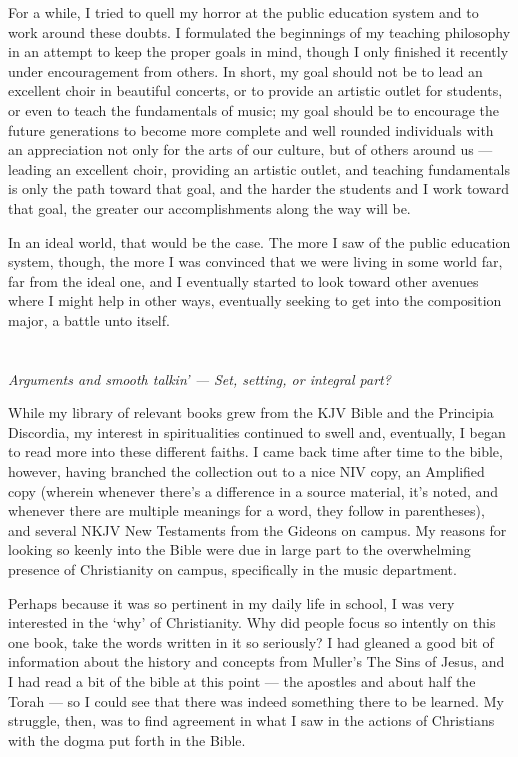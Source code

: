 \documentclass{book}
\begin{document}
For a while, I tried to quell my horror at the public education system and to work around these doubts.  I formulated the beginnings of my teaching philosophy in an attempt to keep the proper goals in mind, though I only finished it recently under encouragement from others.  In short, my goal should not be to lead an excellent choir in beautiful concerts, or to provide an artistic outlet for students, or even to teach the fundamentals of music; my goal should be to encourage the future generations to become more complete and well rounded individuals with an appreciation not only for the arts of our culture, but of others around us --- leading an excellent choir, providing an artistic outlet, and teaching fundamentals is only the path toward that goal, and the harder the students and I work toward that goal, the greater our accomplishments along the way will be.

In an ideal world, that would be the case.  The more I saw of the public education system, though, the more I was convinced that we were living in some world far, far from the ideal one, and I eventually started to look toward other avenues where I might help in other ways, eventually seeking to get into the composition major, a battle unto itself.

\chapter{}
\begin{center}
	\emph{Arguments and smooth talkin' --- Set, setting, or integral part?}
\end{center}

While my library of relevant books grew from the KJV Bible and the Principia Discordia, my interest in spiritualities continued to swell and, eventually, I began to read more into these different faiths.  I came back time after time to the bible, however, having branched the collection out to a nice NIV copy, an Amplified copy (wherein whenever there's a difference in a source material, it's noted, and whenever there are multiple meanings for a word, they follow in parentheses), and several NKJV New Testaments from the Gideons on campus.  My reasons for looking so keenly into the Bible were due in large part to the overwhelming presence of Christianity on campus, specifically in the music department.

Perhaps because it was so pertinent in my daily life in school, I was very interested in the `why' of Christianity.  Why did people focus so intently on this one book, take the words written in it so seriously? I had gleaned a good bit of information about the history and concepts from Muller's The Sins of Jesus, and I had read a bit of the bible at this point --- the apostles and about half the Torah --- so I could see that there was indeed something there to be learned.  My struggle, then, was to find agreement in what I saw in the actions of Christians with the dogma put forth in the Bible.
\end{document}
